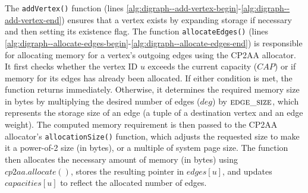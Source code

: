 The \texttt{addVertex()} function (lines \ref{alg:digraph--add-vertex-begin}-\ref{alg:digraph--add-vertex-end}) ensures that a vertex exists by expanding storage if necessary and then setting its existence flag. 
%
The function \texttt{allocateEdges()} (lines \ref{alg:digraph--allocate-edges-begin}-\ref{alg:digraph--allocate-edges-end}) is responsible for allocating memory for a vertex’s outgoing edges using the CP2AA allocator. It first checks whether the vertex ID $u$ exceeds the current capacity ($CAP$) or if memory for its edges has already been allocated. If either condition is met, the function returns immediately. Otherwise, it determines the required memory size in bytes by multiplying the desired number of edges ($deg$) by $\textsc{edge\_size}$, which represents the storage size of an edge (a tuple of a destination vertex and an edge weight). The computed memory requirement is then passed to the CP2AA allocator's \texttt{allocationSize()} function, which adjusts the requested size to make it a power-of-2 size (in bytes), or a multiple of system page size. The function then allocates the necessary amount of memory (in bytes) using $cp2aa.allocate()$, stores the resulting pointer in $edges[u]$, and updates $capacities[u]$ to reflect the allocated number of edges.

